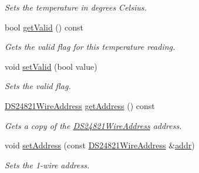 \begin{DoxyCompactItemize}
\begin{DoxyCompactList}\small\item\em Sets the temperature in degrees Celsius. \end{DoxyCompactList}\item 
bool \mbox{\hyperlink{class_d_s2482_device_a50eeb974bc88c7f2a1c3133a9f1cf8bb}{get\+Valid}} () const
\begin{DoxyCompactList}\small\item\em Gets the valid flag for this temperature reading. \end{DoxyCompactList}\item 
\mbox{\label{class_d_s2482_device_a5910ab0269dfbbeb399ab38213ca7e49}} 
void \mbox{\hyperlink{class_d_s2482_device_a5910ab0269dfbbeb399ab38213ca7e49}{set\+Valid}} (bool value)
\begin{DoxyCompactList}\small\item\em Sets the valid flag. \end{DoxyCompactList}\item 
\mbox{\label{class_d_s2482_device_afaef2b385d85c7dd8dd78e6b86cb5751}} 
\mbox{\hyperlink{class_d_s24821_wire_address}{D\+S24821\+Wire\+Address}} \mbox{\hyperlink{class_d_s2482_device_afaef2b385d85c7dd8dd78e6b86cb5751}{get\+Address}} () const
\begin{DoxyCompactList}\small\item\em Gets a copy of the \mbox{\hyperlink{class_d_s24821_wire_address}{D\+S24821\+Wire\+Address}} address. \end{DoxyCompactList}\item 
void \mbox{\hyperlink{class_d_s2482_device_a97f56684da4d9b9670d21041e5da15f4}{set\+Address}} (const \mbox{\hyperlink{class_d_s24821_wire_address}{D\+S24821\+Wire\+Address}} \&\mbox{\hyperlink{class_d_s2482_device_a83f16b37bc9a89032f9a3e4d096f2e1e}{addr}})
\begin{DoxyCompactList}\small\item\em Sets the 1-\/wire address. \end{DoxyCompactList}\end{DoxyCompactItemize}
